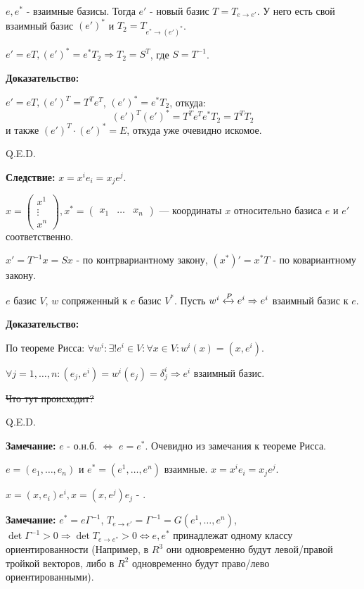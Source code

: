 
$e, e^*$ - взаимные базисы. Тогда $e'$ - новый базис $T = T_{e\rightarrow e'}$.  У него есть свой взаимный базис  $(e')^*$ и $T_2 =T_{e^*\rightarrow (e')^*}$.

$e' = eT, (e')^* = e^* T_2 \Rightarrow T_2 = S^T$, где $S = T^{-1}$.


\textbf{Доказательство:}

$e' = eT, (e')^T = T^Te^T$, $(e')^* = e^* T_2$, откуда:
$$(e')^T (e')^* =   T^T e^T e^* T_2 =T^T T_2$$
и также $(e')^T \cdot (e')^* = E$, откуда уже очевидно искомое.

\hfill Q.E.D.


\textbf{Следствие:} $x = x^i e_i = x_je^j$.

$x = \begin{pmatrix}
    x^1 \\
    \vdots \\
    x^n
\end{pmatrix}, x^* = \begin{pmatrix}
    x_1 & \ldots & x_n
\end{pmatrix}$ --- координаты $x$ относительно базиса $e$ и $e'$ соответственно.

$x' = T^{-1} x =Sx$ - по контрвариантному закону, $(x^*)' = x^*T$ - по ковариантному закону.


$e$ базис $V$, $w$ сопряженный к $e$ базис $V^*$. Пусть $w^i \xleftrightarrow{P}e^i \Rightarrow e^i$ взаимный базис к $e$. 

\textbf{ Доказательство:}

По теореме Рисса: $\forall w^i:\exists! e^i \in V: \forall x \in V: w^i(x) =(x,e^i)$.

$\forall j = 1,\ldots, n: (e_j,e^i) = w^i(e_j) = \delta_j^i \Rightarrow e^i$ взаимный базис.

\sout{Что тут происходит?}

\hfill Q.E.D.

\textbf{Замечание:} $e$ - о.н.б. $\Leftrightarrow$ $e = e^*$. Очевидно из замечания к теореме Рисса.

$e =(e_1,\ldots, e_n)$ и $e^* =(e^1,\ldots, e^n)$ взаимные. $x = x^ie_i =x_je^j$.

$x = (x,e_i)e^i, x= (x,e^j)e_j$ - .

\textbf{Замечание:} $e^* = e \Gamma^{-1}$, $T_{e\rightarrow e'} =\Gamma^{-1}  = G(e^1,\ldots, e^n)$, $ \det \Gamma^{-1}>0\Rightarrow \det T_{e\rightarrow e^*}>0 \Leftrightarrow e, e^*$ принадлежат одному классу ориентированности (Например, в $R^3$ они одновременно будут левой/правой тройкой векторов, либо в $R^2$ одновременно будут право/лево ориентированными).

